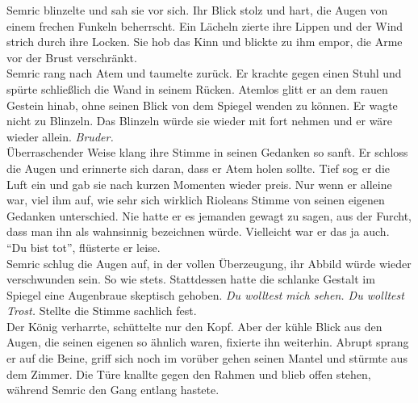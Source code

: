 Semric blinzelte und sah sie vor sich. Ihr Blick stolz und hart, die Augen von einem frechen 
Funkeln beherrscht. Ein Lächeln zierte ihre Lippen und der Wind strich durch ihre Locken. Sie hob 
das Kinn und blickte zu ihm empor, die Arme vor der Brust verschränkt. \\
Semric rang nach Atem und taumelte zurück. Er krachte gegen einen Stuhl und spürte schließlich die 
Wand in seinem Rücken. Atemlos glitt er an dem rauen Gestein hinab, ohne seinen Blick von dem 
Spiegel wenden zu können. Er wagte nicht zu Blinzeln. Das Blinzeln würde sie wieder mit fort nehmen 
und er wäre wieder allein. \textit{Bruder.}\\
Überraschender Weise klang ihre Stimme in seinen Gedanken so sanft. Er schloss die Augen und 
erinnerte sich daran, dass er Atem holen sollte. Tief sog er die Luft ein und gab sie nach kurzen 
Momenten wieder preis. Nur wenn er alleine war, viel ihm auf, wie sehr sich wirklich Rioleans 
Stimme von seinen eigenen Gedanken unterschied. Nie hatte er es jemanden gewagt zu sagen, aus der 
Furcht, dass man ihn als wahnsinnig bezeichnen würde. Vielleicht war er das ja auch.\\
``Du bist tot'', flüsterte er leise.\\
Semric schlug die Augen auf, in der vollen Überzeugung, ihr Abbild würde wieder verschwunden sein. 
So wie stets. Stattdessen hatte die schlanke Gestalt im Spiegel eine Augenbraue skeptisch gehoben. 
\textit{Du wolltest mich sehen. Du wolltest Trost.} Stellte die Stimme sachlich fest. \\
Der König verharrte, schüttelte nur den Kopf. Aber der kühle Blick aus den Augen, die seinen 
eigenen so ähnlich waren, fixierte ihn weiterhin. Abrupt sprang er auf die Beine, griff sich noch 
im vorüber gehen seinen Mantel und stürmte aus dem Zimmer. Die Türe knallte gegen den Rahmen und 
blieb offen stehen, während Semric den Gang entlang hastete.\\

